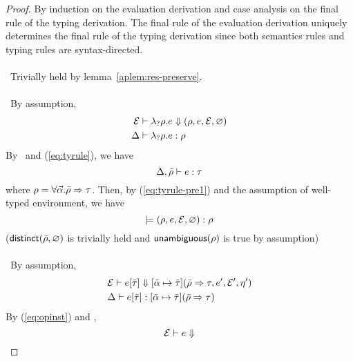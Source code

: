 

\begin{proof} By induction on the evaluation derivation and
  case analysis on the final rule of the typing derivation. The final
  rule of the evaluation derivation uniquely determines the final rule
  of the typing derivation since both semantics rules and typing rules
  are syntax-directed.
  \\
  \\
  \case \OpQuery~Trivially held by lemma~\ref{aplem:res-preserve}.
  \\
  \\
  \case \OpRule~By assumption,
  \begin{align}
    \mathcal{E} \vdash \lambda_? \rho. e & \Downarrow (\rho, e,
      \mathcal{E}, \varnothing) \nonumber \\
    \label{eq:tyrule}
    \Delta \vdash \lambda_? \rho. e&:\rho
  \end{align}
  By \TyRule~and (\ref{eq:tyrule}), we have 
  \begin{equation}
    \label{eq:tyrule-pre1}
    \Delta, \bar{\rho} \vdash e:\tau
  \end{equation}
  where $\rho = \forall \vec{\alpha}. \bar{\rho} \Rightarrow \tau$. Then, by
  (\ref{eq:tyrule-pre1}) and the assumption of well-typed environment,
  we have
  \begin{equation*}
    \models (\rho, e, \mathcal{E}, \varnothing):\rho
  \end{equation*}
  (${\sf distinct}(\bar{\rho}, \varnothing)$ is trivially held and
  ${\sf unambiguous}(\rho)$ is true by assumption)
  \\
  \\
  \case \OpInst~By assumption,
  \begin{align}
    \label{eq:opinst}
    & \mathcal{E} \vdash e[\bar{\tau}] \Downarrow 
    [\bar{\alpha} \mapsto \bar{\tau}]
    (\bar{\rho} \Rightarrow \tau, e', \mathcal{E}', \eta') \\
    \label{eq:tyinst}
    & \Delta \vdash e[\bar{\tau}]:[\bar{\alpha} \mapsto \bar{\tau}] (\bar{\rho} \Rightarrow \tau)
  \end{align}
  By (\ref{eq:opinst}) and \OpInst,
  \begin{equation}
    \label{eq:opinst-pre}
    \tstate \turns e \eval 

\end{equation}
\end{proof}
